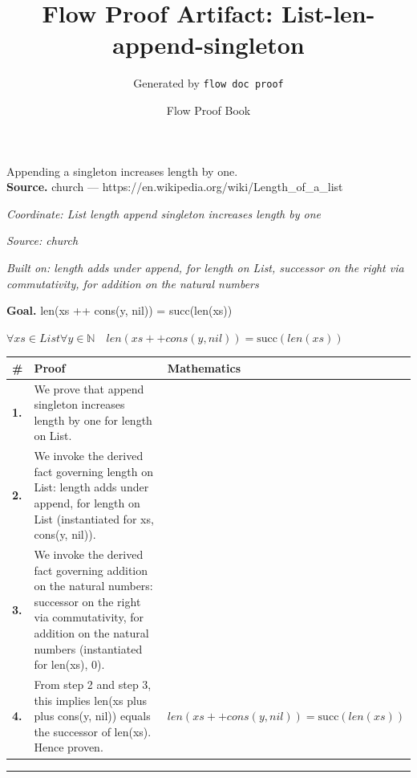 \documentclass[11pt]{article}
\title{Flow Proof Artifact: List-len-append-singleton}
\author{Generated by \texttt{flow doc proof}}
\date{Flow Proof Book}
\theoremstyle{definition}
\begin{document}
\maketitle
Appending a singleton increases length by one.\\[0.5em]
\textbf{Source.} church — https://en.wikipedia.org/wiki/Length\_of\_a\_list\\[0.5em]
\bigskip
{}\par
\smallskip\noindent\textit{Coordinate: List \cdot length \cdot append singleton increases length by one}\par
\smallskip\noindent\textit{Source: church}\par
\smallskip\noindent\textit{Built on: length adds under append, for length on List, successor on the right via commutativity, for addition on the natural numbers}\par
\medskip
\noindent\textbf{Goal.} len(xs ++ cons(y, nil)) = succ(len(xs))\par
\noindent$\displaystyle \forall xs \in List \forall y \in \mathbb{N}\quad len(xs ++ cons(y, nil)) = \mathrm{succ}(len(xs))$\par
\medskip
\noindent
\begin{tabular}{@{} >{\raggedright\arraybackslash}p{} >{\raggedright\arraybackslash}p{} >{\raggedleft\arraybackslash}p{} @{}}
\textbf{\#} & \textbf{Proof} & \textbf{Mathematics} \\
\midrule
\textbf{1.} & We prove that append singleton increases length by one for length on List. & \\[0.45em]
\textbf{2.} & We invoke the derived fact governing length on List: length adds under append, for length on List (instantiated for xs, cons(y, nil)). & \\[0.45em]
\textbf{3.} & We invoke the derived fact governing addition on the natural numbers: successor on the right via commutativity, for addition on the natural numbers (instantiated for len(xs), 0). & \\[0.45em]
\textbf{4.} & From step 2 and step 3, this implies len(xs plus plus cons(y, nil)) equals the successor of len(xs). Hence proven. & $\displaystyle len(xs ++ cons(y, nil)) = \mathrm{succ}(len(xs))$ \\[0.45em]
\bottomrule
\end{tabular}
\label{thm:List-length-append_singleton_increases_length_by_one}
\par\medskip\hrule
\end{document}
